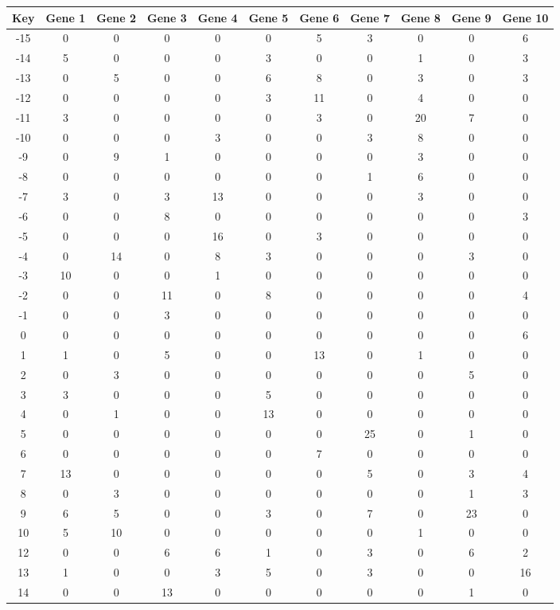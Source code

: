 \begin{tabular}{|c|c|c|c|c|c|c|c|c|c|c|}
\hline
Key & Gene 1 & Gene 2 & Gene 3 & Gene 4 & Gene 5 & Gene 6 & Gene 7 & Gene 8 & Gene 9 & Gene 10 \\
\hline
-15 & 0 & 0 & 0 & 0 & 0 & 5 & 3 & 0 & 0 & 6 \\
-14 & 5 & 0 & 0 & 0 & 3 & 0 & 0 & 1 & 0 & 3 \\
-13 & 0 & 5 & 0 & 0 & 6 & 8 & 0 & 3 & 0 & 3 \\
-12 & 0 & 0 & 0 & 0 & 3 & 11 & 0 & 4 & 0 & 0 \\
-11 & 3 & 0 & 0 & 0 & 0 & 3 & 0 & 20 & 7 & 0 \\
-10 & 0 & 0 & 0 & 3 & 0 & 0 & 3 & 8 & 0 & 0 \\
-9 & 0 & 9 & 1 & 0 & 0 & 0 & 0 & 3 & 0 & 0 \\
-8 & 0 & 0 & 0 & 0 & 0 & 0 & 1 & 6 & 0 & 0 \\
-7 & 3 & 0 & 3 & 13 & 0 & 0 & 0 & 3 & 0 & 0 \\
-6 & 0 & 0 & 8 & 0 & 0 & 0 & 0 & 0 & 0 & 3 \\
-5 & 0 & 0 & 0 & 16 & 0 & 3 & 0 & 0 & 0 & 0 \\
-4 & 0 & 14 & 0 & 8 & 3 & 0 & 0 & 0 & 3 & 0 \\
-3 & 10 & 0 & 0 & 1 & 0 & 0 & 0 & 0 & 0 & 0 \\
-2 & 0 & 0 & 11 & 0 & 8 & 0 & 0 & 0 & 0 & 4 \\
-1 & 0 & 0 & 3 & 0 & 0 & 0 & 0 & 0 & 0 & 0 \\
0 & 0 & 0 & 0 & 0 & 0 & 0 & 0 & 0 & 0 & 6 \\
1 & 1 & 0 & 5 & 0 & 0 & 13 & 0 & 1 & 0 & 0 \\
2 & 0 & 3 & 0 & 0 & 0 & 0 & 0 & 0 & 5 & 0 \\
3 & 3 & 0 & 0 & 0 & 5 & 0 & 0 & 0 & 0 & 0 \\
4 & 0 & 1 & 0 & 0 & 13 & 0 & 0 & 0 & 0 & 0 \\
5 & 0 & 0 & 0 & 0 & 0 & 0 & 25 & 0 & 1 & 0 \\
6 & 0 & 0 & 0 & 0 & 0 & 7 & 0 & 0 & 0 & 0 \\
7 & 13 & 0 & 0 & 0 & 0 & 0 & 5 & 0 & 3 & 4 \\
8 & 0 & 3 & 0 & 0 & 0 & 0 & 0 & 0 & 1 & 3 \\
9 & 6 & 5 & 0 & 0 & 3 & 0 & 7 & 0 & 23 & 0 \\
10 & 5 & 10 & 0 & 0 & 0 & 0 & 0 & 1 & 0 & 0 \\
12 & 0 & 0 & 6 & 6 & 1 & 0 & 3 & 0 & 6 & 2 \\
13 & 1 & 0 & 0 & 3 & 5 & 0 & 3 & 0 & 0 & 16 \\
14 & 0 & 0 & 13 & 0 & 0 & 0 & 0 & 0 & 1 & 0 \\
\hline
\end{tabular}